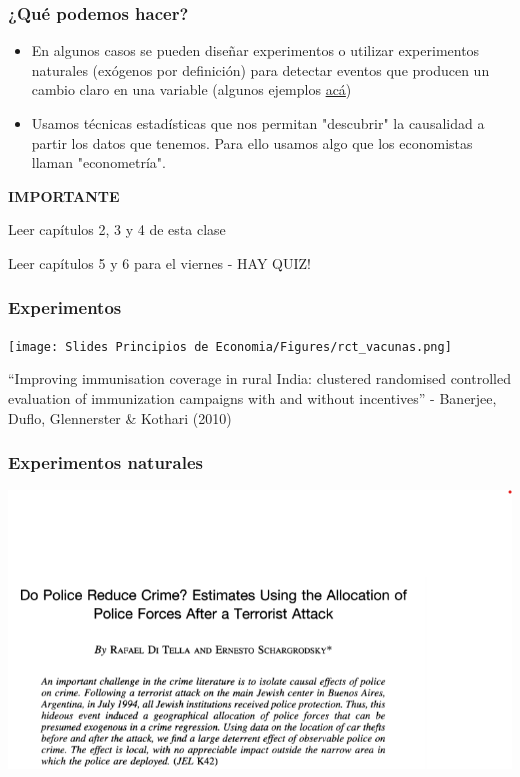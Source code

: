 \documentclass{beamer}
\begin{document}
\begin{frame} 
    \frametitle{¿Qué podemos hacer?}
    \begin{itemize}
        \item  En algunos casos se pueden diseñar experimentos o utilizar experimentos naturales (exógenos por definición) para detectar eventos que producen un cambio claro en una variable (algunos ejemplos \hyperlink{appendix}{acá})
        \item Usamos técnicas estadísticas que nos permitan "descubrir" la causalidad a partir los datos que tenemos. Para ello usamos algo que los economistas llaman "econometría". 
    \end{itemize}
\end{frame}

\begin{frame}
    \begin{center}
        \LARGE  \textbf{IMPORTANTE}  \\ \vspace{1cm}
        \Large 
        \begin{boxB}
        \centering Leer capítulos 2, 3 y 4 de esta clase
        \end{boxB}
        \vspace{0.5cm}
        \begin{boxB}
        Leer capítulos 5 y 6 para el viernes - HAY QUIZ!
        \end{boxB}
    \end{center}
\end{frame}

\begin{frame} \label{appendix}
    \frametitle{Experimentos}
    \begin{center}
    \texttt{[image: Slides Principios de Economia/Figures/rct\_vacunas.png]}
    \end{center}
    “Improving immunisation coverage in rural India: clustered randomised controlled evaluation of immunization campaigns with and without incentives” - Banerjee, Duflo, Glennerster \& Kothari (2010) \\  \vspace{2mm}
\end{frame}
    
\begin{frame} 
    \frametitle{Experimentos naturales}
    \begin{center}
        \includegraphics[scale=0.5]{../Figures/Do_Police_Induce_Crime.png}
    \end{center}
\end{frame}
\end{document}
